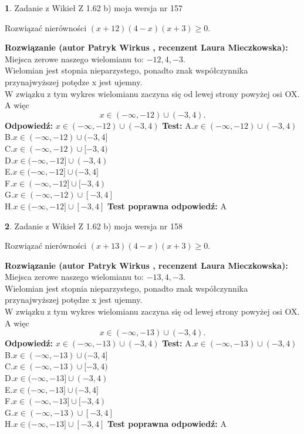 \documentclass[12pt, a4paper]{article}
\theoremstyle{definition} %
\newtheorem{zad}{}
\newcommand{\zadStart}[1]{\begin{zad}#1\newline}
\newcommand{\zadStop}{\end{zad}}
\newcommand{\rozwStart}[2]{\noindent \textbf{Rozwiązanie (autor #1 , recenzent #2): }\newline}
\newcommand{\rozwStop}{\newline}
\newcommand{\odpStart}{\noindent \textbf{Odpowiedź:}\newline}
\newcommand{\odpStop}{\newline}
\newcommand{\testStart}{\noindent \textbf{Test:}\newline}
\newcommand{\testStop}{\newline}
\newcommand{\kluczStart}{\noindent \textbf{Test poprawna odpowiedź:}\newline}
\newcommand{\kluczStop}{\newline}
\begin{document}
\zadStart{Zadanie z Wikieł Z 1.62 b) moja wersja nr 157}

Rozwiązać nierówności $(x+12)(4-x)(x+3)\ge0$.
\zadStop
\rozwStart{Patryk Wirkus}{Laura Mieczkowska}
Miejsca zerowe naszego wielomianu to: $-12, 4, -3$.\\
Wielomian jest stopnia nieparzystego, ponadto znak współczynnika przy\linebreak najwyższej potędze x jest ujemny.\\ W związku z tym wykres wielomianu zaczyna się od lewej strony powyżej osi OX. A więc $$x \in (-\infty,-12) \cup (-3,4).$$
\rozwStop
\odpStart
$x \in (-\infty,-12) \cup (-3,4)$
\odpStop
\testStart
A.$x \in (-\infty,-12) \cup (-3,4)$\\
B.$x \in (-\infty,-12) \cup (-3,4]$\\
C.$x \in (-\infty,-12) \cup [-3,4)$\\
D.$x \in (-\infty,-12] \cup (-3,4)$\\
E.$x \in (-\infty,-12] \cup (-3,4]$\\
F.$x \in (-\infty,-12] \cup [-3,4)$\\
G.$x \in (-\infty,-12) \cup [-3,4]$\\
H.$x \in (-\infty,-12] \cup [-3,4]$
\testStop
\kluczStart
A
\kluczStop



\zadStart{Zadanie z Wikieł Z 1.62 b) moja wersja nr 158}

Rozwiązać nierówności $(x+13)(4-x)(x+3)\ge0$.
\zadStop
\rozwStart{Patryk Wirkus}{Laura Mieczkowska}
Miejsca zerowe naszego wielomianu to: $-13, 4, -3$.\\
Wielomian jest stopnia nieparzystego, ponadto znak współczynnika przy\linebreak najwyższej potędze x jest ujemny.\\ W związku z tym wykres wielomianu zaczyna się od lewej strony powyżej osi OX. A więc $$x \in (-\infty,-13) \cup (-3,4).$$
\rozwStop
\odpStart
$x \in (-\infty,-13) \cup (-3,4)$
\odpStop
\testStart
A.$x \in (-\infty,-13) \cup (-3,4)$\\
B.$x \in (-\infty,-13) \cup (-3,4]$\\
C.$x \in (-\infty,-13) \cup [-3,4)$\\
D.$x \in (-\infty,-13] \cup (-3,4)$\\
E.$x \in (-\infty,-13] \cup (-3,4]$\\
F.$x \in (-\infty,-13] \cup [-3,4)$\\
G.$x \in (-\infty,-13) \cup [-3,4]$\\
H.$x \in (-\infty,-13] \cup [-3,4]$
\testStop
\kluczStart
A
\kluczStop
\end{document}
